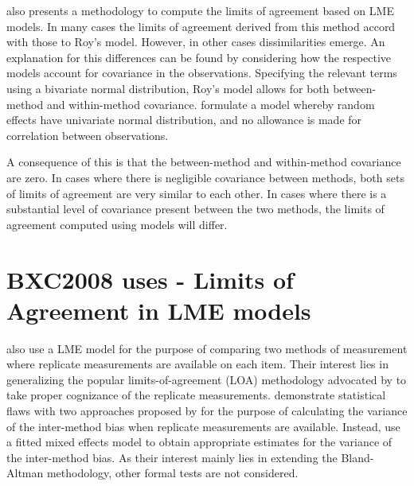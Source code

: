 \documentclass[12pt, a4paper]{report}
\theoremstyle{plain}
\theoremstyle{definition}
\theoremstyle{remark}
\begin{document}
	\citet{BXC2008} also presents a methodology to compute the limits of agreement based on LME models. In many cases the limits of agreement derived from this method accord with those to Roy's model. However, in other cases dissimilarities emerge. An explanation for this differences can be found by considering how the respective models account for covariance in the observations. Specifying the relevant terms using a bivariate normal distribution, Roy's model allows for both between-method and within-method covariance. \citet{BXC2008} formulate a model whereby random effects have univariate normal distribution, and no allowance is made for correlation between observations.
	
	A consequence of this is that the between-method and within-method covariance are zero. In cases where there is negligible covariance between methods, both sets of limits of agreement are very similar to each other. In cases where there is a substantial level of covariance present between the two methods, the limits of agreement computed using models will differ.
	
	
	\newpage
	\section{BXC2008 uses - Limits of Agreement in LME models}
\citet{BXC2008} also use a LME model for the purpose of comparing two methods of measurement where replicate measurements are available on each item. Their interest lies in generalizing the popular limits-of-agreement (LOA) methodology advocated by \citet{BA86} to take proper cognizance of the replicate measurements. \citet{BXC2008} demonstrate statistical flaws with two approaches proposed by \citet{BA99} for the purpose of calculating the variance of the inter-method bias when replicate measurements are available. Instead, \citet{BXC2008} use a fitted mixed effects model to obtain appropriate estimates for the variance of the inter-method bias.  As their interest mainly lies in extending the Bland-Altman methodology, other formal tests are not considered.
\end{document}
